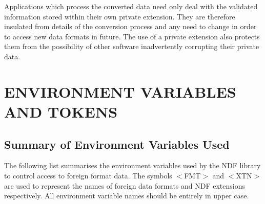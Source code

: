 Applications which process the converted data need only deal with the
validated information stored within their own private extension. They
are therefore insulated from details of the conversion process and any
need to change in order to access new data formats in future. The use
of a private extension also protects them from the possibility of
other software inadvertently corrupting their private data.

\newpage
\appendix

\section{ENVIRONMENT VARIABLES AND TOKENS}

\subsection{Summary of Environment Variables Used}

The following list summarises the environment variables used by the
NDF library to control access to foreign format data.  The symbols
$<$FMT$>$ and $<$XTN$>$ are used to represent the names of foreign
data formats and NDF extensions respectively.  All environment
variable names should be entirely in upper case.

